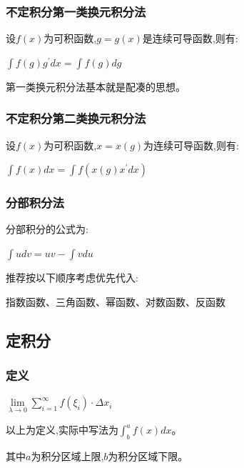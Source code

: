 \documentclass[UTF8]{ctexbook}
\newcommand{\limNormal}[1]{\lim\limits_{#1}}
\newcommand{\derivative}{^\prime}
\newcommand{\upDownSum}[2]{\sum\limits_{#2}^{#1}}
\newcommand{\defFunction}[1]{f(#1)}
\newcommand{\definiteIntegral}[2]{\int^{#1}_{#2}}
\begin{document}
{{{{  }%

  \subsubsection{不定积分第一类换元积分法}{
    设$\defFunction{x}$为可积函数,$g = g(x)$是连续可导函数,则有:

    $\int \defFunction{g}g\derivative dx = \int \defFunction{g}dg$

    第一类换元积分法基本就是配凑的思想。

  }%

  \subsubsection{不定积分第二类换元积分法}{
    设$\defFunction{x}$为可积函数,$x = x(g)$为连续可导函数,则有:

    $\int \defFunction{x}dx = \int \defFunction{x(g)x\derivative dx}$

  }%

  \subsubsection{分部积分法}{
    分部积分的公式为:

    $\int udv = uv - \int v du$

    推荐按以下顺序考虑优先代入:

    指数函数、三角函数、幂函数、对数函数、反函数
  }%

}%

\subsection{定积分}{

\subsubsection{定义}{
  $\limNormal{\lambda \to 0}\upDownSum{\infty}{i = 1}\defFunction{\xi_i}\cdot\Delta x_i$

  以上为定义,实际中写法为$\definiteIntegral{a}{b}\defFunction{x}dx$。

  其中$a$为积分区域上限,$b$为积分区域下限。
}%

}}}
\end{document}
